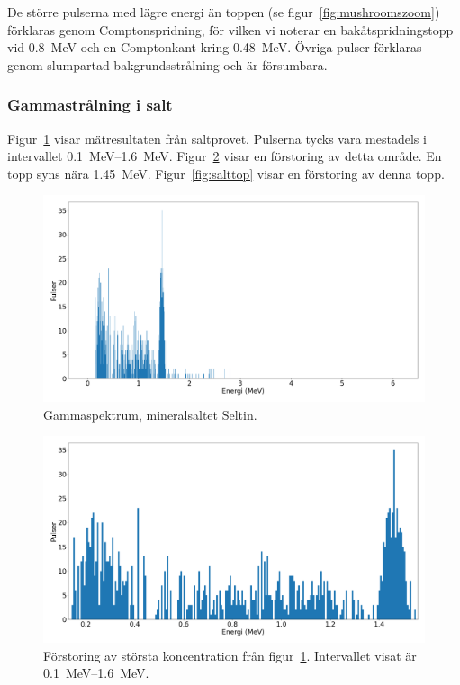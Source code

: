De större pulserna med lägre energi än toppen (se
figur~\ref{fig:mushroomszoom}) förklaras genom Comptonspridning, för vilken
vi noterar en bakåtspridningstopp vid \qty{0.8}{\MeV} och en Comptonkant kring
\qty{0.48}{\MeV}. Övriga pulser förklaras genom slumpartad bakgrundsstrålning
och är försumbara.

\subsubsection{Gammastrålning i salt} \label{sec:salt}

Figur~\ref{fig:salt} visar mätresultaten från saltprovet. Pulserna tycks vara
mestadels i intervallet \qtyrange{0.1}{1.6}{\MeV}. Figur~\ref{fig:saltzoom}
visar en förstoring av detta område. En topp syns nära \qty{1.45}{\MeV}.
Figur~\ref{fig:salttop} visar en förstoring av denna topp.

\begin{figure}[!hp]
    \centering
    \includegraphics[width=\textwidth, keepaspectratio]{../images/salt.png}
    \caption{Gammaspektrum, mineralsaltet Seltin.}
    \label{fig:salt}
\end{figure}

\begin{figure}[!hp]
    \centering
    \includegraphics[width=\textwidth, keepaspectratio]{../images/salt_zoom.png}
    \caption{
        Förstoring av största koncentration från figur~\ref{fig:salt}.
        Intervallet visat är \qtyrange{0.1}{1.6}{\MeV}.
    }
    \label{fig:saltzoom}
\end{figure}

